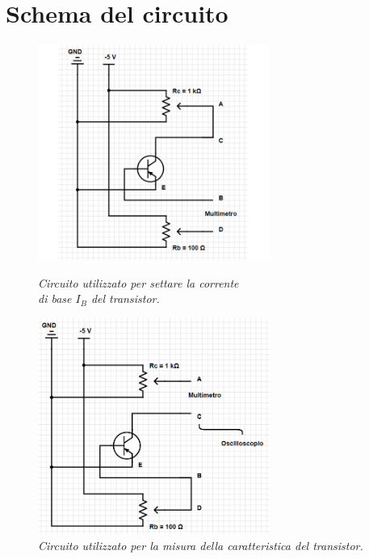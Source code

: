 \documentclass[a4paper, 11pt]{article}
\begin{document}
\section{Schema del circuito}
\begin{figure}[!ht]
  \centering
  \begin{minipage}[b]{0.51\textwidth}
    \includegraphics[width=76mm]{Immagini - Seconda prova/Schema circuito 1.png}
    \caption{\textit{Circuito utilizzato per settare la corrente \\ di base $I_B$ del transistor.}}
    \label{fig:Circuito per corrente di base}
  \end{minipage}
  \hfill
  \begin{minipage}[b]{0.48\textwidth}
    \includegraphics[width=76mm]{Immagini - Seconda prova/Schema circuito 2.png}
    \caption{\textit{Circuito utilizzato per la misura della caratteristica del transistor.}}
    \label{fig:Circuito utilizzato per la prova}
  \end{minipage}
\end{figure}
\end{document}
